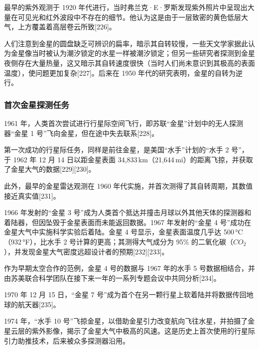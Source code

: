最早的紫外观测于 1920 年代进行，当时弗兰克·E·罗斯发现紫外照片中呈现出大量在可见光和红外波段中不存在的细节。他认为这是由于一层致密的黄色低层大气，上方覆盖着高层卷云所致[226]。

人们注意到金星的圆盘缺乏可辨识的扁率，暗示其自转较慢，一些天文学家据此认为金星像当时被认为潮汐锁定的水星一样被潮汐锁定；但另一些研究者探测到金星夜侧存在大量热量，这又暗示其自转速度很快（当时人们尚未意识到其极高的表面温度），使问题更加复杂[227]。后来在 1950 年代的研究表明，金星的自转为逆行。
\subsubsection{首次金星探测任务}
1961 年，人类首次尝试进行行星际空间飞行，即苏联“金星”计划中的无人探测器“金星 1 号”飞向金星，但在途中失去联系[228]。

第一次成功的行星际任务，同样是前往金星，是美国“水手”计划的“水手 2 号”，于 1962 年 12 月 14 日以距金星表面 34,833\,km（21,644\,mi）的距离飞掠，并获取了金星大气的数据[229][230]。

此外，最早的金星雷达观测在 1960 年代实施，并首次测得了其自转周期，其数值接近真实值[231]。

1966 年发射的“金星 3 号”成为人类首个抵达并撞击月球以外其他天体的探测器和着陆器，但因坠毁于金星表面而未能返回数据。1967 年发射的“金星 4 号”成功在金星大气中实施科学实验后着陆。金星 4 号显示，金星表面温度几乎达 500\,°C（932\,°F），比水手 2 号计算的更高；其测得大气成分为 95\% 的二氧化碳（$CO_{2}$），并发现金星大气密度远超设计者的预期[232][233]。

作为早期太空合作的范例，金星 4 号的数据与 1967 年的水手 5 号数据相结合，并由苏美联合科学团队在接下来一年的一系列专题会议中共同分析[234]。

1970 年 12 月 15 日，“金星 7 号”成为首个在另一颗行星上软着陆并将数据传回地球的航天器[235]。

1974 年，“水手 10 号”飞掠金星，以借助金星引力改变航向飞往水星，并拍摄了金星云层的紫外影像，揭示了金星大气中极高的风速。这是历史上首次使用的行星际引力助推技术，后来被众多探测器沿用。

